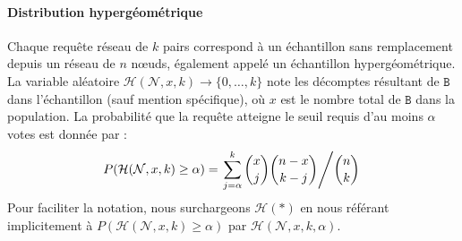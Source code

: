 \documentclass[a4,twocolumn,10pt]{article}
\theoremstyle{definition}
\begin{document}
\begin{appendices}
\paragraph{Distribution hypergéométrique} Chaque requête réseau de $k$ pairs correspond à un échantillon sans remplacement depuis un réseau de $n$ nœuds, également appelé un échantillon hypergéométrique.
La variable aléatoire $\mathcal{H}(\mathcal{N}, x, k) \rightarrow \{0, \dots, k\}$ note les décomptes résultant de $\mathtt{B}$ dans l'échantillon (sauf mention spécifique), où $x$ est le nombre total de $\mathtt{B}$ dans la population. La probabilité que la requête atteigne le seuil requis d'au moins $\alpha$ votes est donnée par :
\begin{equation}
\small
P(\mathcal{H}(\mathcal{N}, x, k) \geq \alpha) = \left.\sum_{j = \alpha}^{k} {x \choose j} {n - x \choose k - j} \middle/ {n \choose k}\right.
\label{eq:hypergeometric}
\end{equation}
Pour faciliter la notation, nous surchargeons $\mathcal{H}(*)$ en nous référant implicitement à $P(\mathcal{H}(\mathcal{N}, x, k) \geq \alpha)$ par $\mathcal{H}(\mathcal{N}, x, k, \alpha)$.


\end{appendices}
\end{document}
